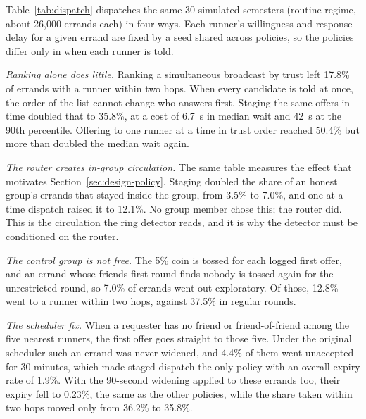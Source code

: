 Table~\ref{tab:dispatch} dispatches the same 30 simulated semesters (routine regime,
about 26,000 errands each) in four ways. Each runner's willingness and response delay
for a given errand are fixed by a seed shared across policies, so the policies differ
only in when each runner is told.

\emph{Ranking alone does little.} Ranking a simultaneous broadcast by trust left
17.8\% of errands with a runner within two hops. When every candidate is told at
once, the order of the list cannot change who answers first. Staging the same offers
in time doubled that to 35.8\%, at a cost of 6.7~s in median wait and 42~s at the
90th percentile. Offering to one runner at a time in trust order reached 50.4\% but
more than doubled the median wait again.

\emph{The router creates in-group circulation.} The same table measures the effect
that motivates Section~\ref{sec:design-policy}. Staging doubled the share of an
honest group's errands that stayed inside the group, from 3.5\% to 7.0\%, and
one-at-a-time dispatch raised it to 12.1\%. No group member chose this; the router
did. This is the circulation the ring detector reads, and it is why the detector
must be conditioned on the router.

\emph{The control group is not free.} The 5\% coin is tossed for each logged first
offer, and an errand whose friends-first round finds nobody is tossed again for the
unrestricted round, so 7.0\% of errands went out exploratory. Of those, 12.8\% went
to a runner within two hops, against 37.5\% in regular rounds.

\emph{The scheduler fix.} When a requester has no friend or friend-of-friend among the
five nearest runners, the first offer goes straight to those five. Under the original
scheduler such an errand was never widened, and 4.4\% of them went unaccepted for 30
minutes, which made staged dispatch the only policy with an overall expiry rate of
1.9\%. With the 90-second widening applied to these errands too, their expiry fell
to 0.23\%, the same as the other policies, while the share taken within two hops
moved only from 36.2\% to 35.8\%.


